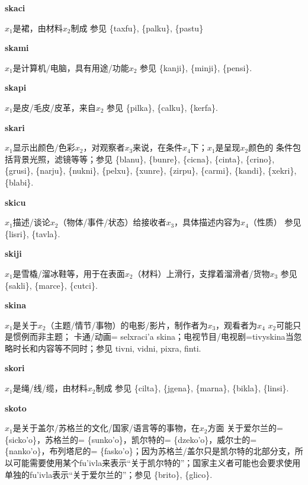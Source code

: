 \documentclass[notitlepage,twocolumn,a4paper,10pt]{book}
\begin{document}
{\sffamily\bfseries skaci} $x_1$是裙，由材料$x_2$制成 \textemdash{} 参见 \{taxfu\}, \{palku\}, \{pastu\}

{\sffamily\bfseries skami}\enspace {\ttfamily\bfseries[sam]}  $x_1$是计算机\slash{}电脑，具有用途\slash{}功能$x_2$ \textemdash{} 参见 \{kanji\}, \{minji\}, \{pensi\}.

{\sffamily\bfseries skapi}\enspace {\ttfamily\bfseries[kap]}  $x_1$是皮\slash{}毛皮\slash{}皮革，来自$x_2$ \textemdash{} 参见 \{pilka\}, \{calku\}, \{kerfa\}.

{\sffamily\bfseries skari}\enspace {\ttfamily\bfseries[    ska]}  $x_1$显示出颜色\slash{}色彩$x_2$，对观察者$x_3$来说，在条件$x_4$下；$x_1$是呈现$x_2$颜色的 \textemdash{} 条件包括背景光照，滤镜等等；参见 \{blanu\}, \{bunre\}, \{cicna\}, \{cinta\}, \{crino\}, \{grusi\}, \{narju\}, \{nukni\}, \{pelxu\}, \{xunre\}, \{zirpu\}, \{carmi\}, \{kandi\}, \{xekri\}, \{blabi\}.

{\sffamily\bfseries skicu}\enspace {\ttfamily\bfseries[    ski]}  $x_1$描述\slash{}谈论$x_2$（物体\slash{}事件\slash{}状态）给接收者$x_3$，具体描述内容为$x_4$（性质） \textemdash{} 参见 \{lisri\}, \{tavla\}.

{\sffamily\bfseries skiji}\enspace {\ttfamily\bfseries[sij]}  $x_1$是雪橇\slash{}溜冰鞋等，用于在表面$x_2$（材料）上滑行，支撑着溜滑者\slash{}货物$x_3$ \textemdash{} 参见 \{sakli\}, \{marce\}, \{cutci\}.

{\sffamily\bfseries skina}\enspace {\ttfamily\bfseries[kin]}  $x_1$是关于$x_2$（主题\slash{}情节\slash{}事物）的电影\slash{}影片，制作者为$x_3$，观看者为$x_4$ \textemdash{} $x_2$可能只是惯例而非主题； 卡通\slash{}动画= {selxraci'a} {skina}；电视节目\slash{}电视剧={tivyskina}当忽略时长和内容等不同时；参见 {tivni}, {vidni}, {pixra}, {finti}.

{\sffamily\bfseries skori}\enspace {\ttfamily\bfseries[    sko]}  $x_1$是绳\slash{}线\slash{}缆，由材料$x_2$制成 \textemdash{} 参见 \{cilta\}, \{jgena\}, \{marna\}, \{bikla\}, \{linsi\}.

{\sffamily\bfseries skoto}\enspace {\ttfamily\bfseries[kot     ko'o]}  $x_1$是关于盖尔\slash{}苏格兰的文化\slash{}国家\slash{}语言等的事物，在$x_2$方面 \textemdash{} 关于爱尔兰的= \{sicko'o\}，苏格兰的= \{sunko'o\}，凯尔特的= \{dzeko'o\}，威尔士的= \{nanko'o\}，布列塔尼的= \{fasko'o\}；因为苏格兰\slash{}盖尔只是凯尔特的北部分支，所以可能需要使用某个fu'ivla来表示“关于凯尔特的”；国家主义者可能也会要求使用单独的fu'ivla表示“关于爱尔兰的”；参见 \{brito\}, \{glico\}.
\end{document}
